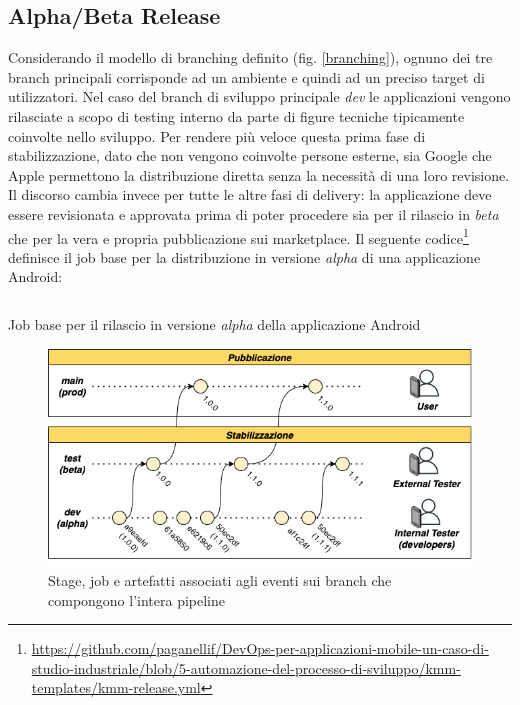 \subsection{Alpha/Beta Release}
Considerando il modello di branching definito (fig. \ref{branching}), ognuno dei tre branch principali corrisponde ad un ambiente e quindi ad un preciso target di utilizzatori. Nel caso del branch di sviluppo principale \textit{dev} le applicazioni vengono rilasciate a scopo di testing interno da parte di figure tecniche tipicamente coinvolte nello sviluppo. Per rendere più veloce questa prima fase di stabilizzazione, dato che non vengono coinvolte persone esterne, sia Google che Apple permettono la distribuzione diretta senza la necessità di una loro revisione. Il discorso cambia invece per tutte le altre fasi di delivery: la applicazione deve essere revisionata e approvata prima di poter procedere sia per il rilascio in \textit{beta} che per la vera e propria pubblicazione sui marketplace. Il seguente codice\footnote{\href{https://github.com/paganellif/DevOps-per-applicazioni-mobile-un-caso-di-studio-industriale/blob/5-automazione-del-processo-di-sviluppo/kmm-templates/kmm-release.yml}{https://github.com/paganellif/DevOps-per-applicazioni-mobile-un-caso-di-studio-industriale/blob/5-automazione-del-processo-di-sviluppo/kmm-templates/kmm-release.yml}} definisce il job base per la distribuzione in versione \textit{alpha} di una applicazione Android:

\begin{listing}[H]
    \inputminted{yaml}{code/android-alpha-release-job.yaml}
    \caption{Job base per il rilascio in versione \textit{alpha} della applicazione Android}
\end{listing}

\begin{figure}[H]
    \centering
    \includegraphics[width=1\textwidth]{img/release-flow.png}
    \caption{Stage, job e artefatti associati agli eventi sui branch che compongono l'intera pipeline}
    \label{release-alpha-beta-flow}
\end{figure}

